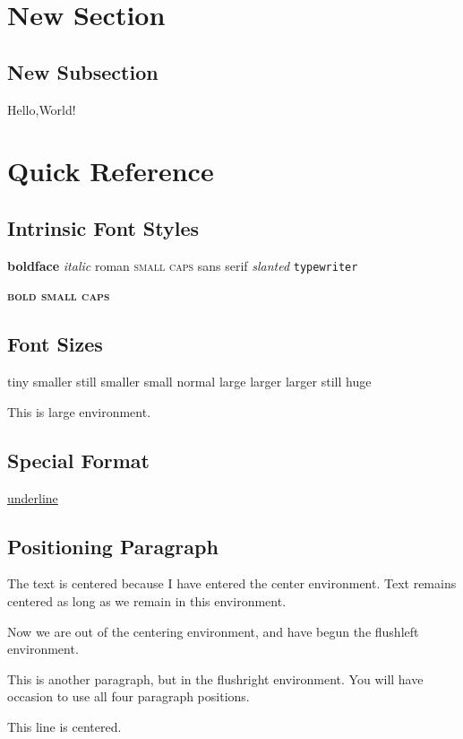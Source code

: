 \documentclass{article}
\begin{document}
\section{New Section}

\subsection{New Subsection}

Hello,World!

\section{Quick Reference}

\subsection{Intrinsic Font Styles}

\textbf{boldface}
\textit{italic} 
\textrm{roman}
\textsc{small caps}
\textsf{sans serif}
\textsl{slanted}
\texttt{typewriter}

\textbf{\textsc{bold small caps}}

\subsection{Font Sizes}
{\tiny tiny} {\scriptsize smaller still} {\footnotesize smaller} {\small small} normal {\large large} {\Large larger} {\LARGE larger still} {\huge huge}

\begin{large} This is large environment.\end{large}

\subsection{Special Format}
\underline{underline}  

\subsection{Positioning Paragraph}
\begin{center}
The text is centered because I have entered the center environment.
Text remains centered as long as we remain in this environment.
\end{center}
\begin{flushleft}
Now we are out of the centering environment, and have begun the
flushleft environment.
\end{flushleft}
\begin{flushright}
This is another paragraph, but in the flushright environment.
You will have occasion to use all four paragraph positions.
\end{flushright}
\centerline{This line is centered.}
\end{document}
